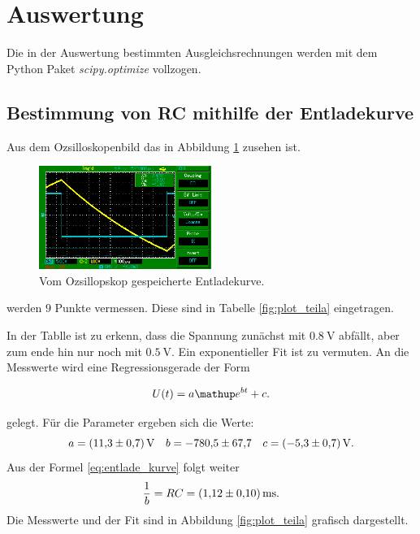 \section{Auswertung}
Die in der Auswertung bestimmten Ausgleichsrechnungen werden mit
dem Python Paket \emph{scipy.optimize} vollzogen.

\subsection{Bestimmung von RC mithilfe der Entladekurve}

Aus dem Ozsilloskopenbild das in Abbildung \ref{fig:entladekurve} zusehen ist.

\begin{figure}
  \centering
  \includegraphics[width=0.5\textwidth]{pics/bilda_508hz.png}
  \caption{Vom Ozsillopskop gespeicherte Entladekurve.}
  \label{fig:entladekurve}
\end{figure}
werden  $9$ Punkte vermessen.
Diese sind in Tabelle \ref{fig:plot_teila} eingetragen.
\FloatBarrier

\FloatBarrier
In der Tablle ist zu erkenn, dass die Spannung zunächst mit $\SI{0.8}{\volt}$
abfällt, aber zum ende hin nur noch mit $\SI{0.5}{\volt}$.
Ein exponentieller Fit ist zu vermuten.
An die Messwerte wird eine Regressionsgerade der Form

\begin{equation*}
  U(t)=a\map{e}^{bt}+c.
\end{equation*}

gelegt.
Für die Parameter ergeben sich die Werte:
\begin{equation}
  \label{eq:parameter_teila}
a=\SI{11.3\pm0.7}{\volt} \quad b=\num{-780.5\pm67.7} \quad c=\SI{-5.3\pm0.7}{\volt}.
\end{equation}
Aus der Formel  \eqref{eq:entlade_kurve} folgt weiter
\begin{equation}
  \frac{1}{b}=RC=\SI{1.12\pm0.1}{\milli\second}.
\end{equation}
Die Messwerte und der Fit sind in Abbildung \ref{fig:plot_teila} grafisch
dargestellt.


